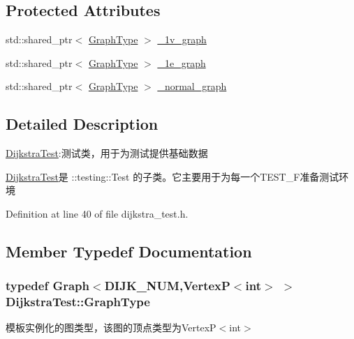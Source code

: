 \subsection*{Protected Attributes}
\begin{DoxyCompactItemize}
\item 
std\+::shared\+\_\+ptr$<$ \hyperlink{class_dijkstra_test_af1d630aa34cb90e7bc11e2bcef82a2d7}{Graph\+Type} $>$ \hyperlink{class_dijkstra_test_ad7c2ba728d52c2265fd629da2c9a383c}{\+\_\+1v\+\_\+graph}
\item 
std\+::shared\+\_\+ptr$<$ \hyperlink{class_dijkstra_test_af1d630aa34cb90e7bc11e2bcef82a2d7}{Graph\+Type} $>$ \hyperlink{class_dijkstra_test_ac99e2d7d0096e66a7abf7f1275b3a39a}{\+\_\+1e\+\_\+graph}
\item 
std\+::shared\+\_\+ptr$<$ \hyperlink{class_dijkstra_test_af1d630aa34cb90e7bc11e2bcef82a2d7}{Graph\+Type} $>$ \hyperlink{class_dijkstra_test_a7cdee342c58a60c71e394fd4c4ebfb94}{\+\_\+normal\+\_\+graph}
\end{DoxyCompactItemize}


\subsection{Detailed Description}
\hyperlink{class_dijkstra_test}{Dijkstra\+Test}\+:测试类，用于为测试提供基础数据 

{\ttfamily \hyperlink{class_dijkstra_test}{Dijkstra\+Test}}是 {\ttfamily \+::testing\+::\+Test} 的子类。它主要用于为每一个{\ttfamily T\+E\+S\+T\+\_\+\+F}准备测试环境 

Definition at line 40 of file dijkstra\+\_\+test.\+h.



\subsection{Member Typedef Documentation}
\hypertarget{class_dijkstra_test_af1d630aa34cb90e7bc11e2bcef82a2d7}{}
\subsubsection[{Graph\+Type}]{\setlength{\rightskip}{0pt plus 5cm}typedef {\bf Graph}$<$D\+I\+J\+K\+\_\+\+N\+U\+M,{\bf Vertex\+P}$<$int$>$ $>$ {\bf Dijkstra\+Test\+::\+Graph\+Type}}\label{class_dijkstra_test_af1d630aa34cb90e7bc11e2bcef82a2d7}
模板实例化的图类型，该图的顶点类型为{\ttfamily Vertex\+P$<$int$>$} 

